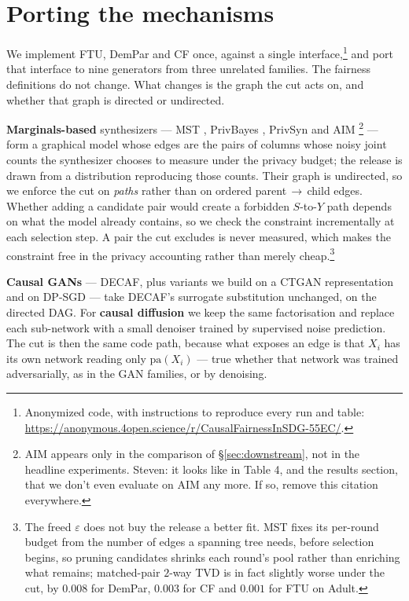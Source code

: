 \documentclass{article}
\newcommand{\s}[1]{\textcolor{Dandelion}{Steven: #1}}
\begin{document}
\section{Porting the mechanisms}
\label{sec:method}

We implement FTU, DemPar and CF once, against a single
interface,\footnote{Anonymized code, with instructions to reproduce every run
and table: \url{https://anonymous.4open.science/r/CausalFairnessInSDG-55EC/}.}
and port that interface to nine generators from three unrelated families. The
fairness definitions do not change. What changes is the graph the cut acts on,
and whether that graph is directed or undirected.

\textbf{Marginals-based} synthesizers --- MST \citep{mckenna2021mst},
PrivBayes \citep{zhang2014privbayes}, PrivSyn \citep{zhang2021privsyn} and
AIM \citep{mckenna2022aim}\footnote{AIM appears only in the comparison of
\S\ref{sec:downstream}, not in the headline experiments. \s{it looks like in Table 4, and the results section, that we don't even evaluate on AIM any more. If so, remove this citation everywhere.}} --- form a graphical model
whose edges are the pairs of columns whose noisy joint counts the synthesizer
chooses to measure under the privacy budget; the release is drawn from a
distribution reproducing those counts. Their graph is undirected, so we
enforce the cut on \emph{paths} rather than on ordered
parent\,$\rightarrow$\,child edges. Whether adding a candidate pair would
create a forbidden $S$-to-$Y$ path depends on what the model already
contains, so we check the constraint incrementally at each selection step. A
pair the cut excludes is never measured, which makes the constraint free in
the privacy accounting rather than merely cheap.\footnote{The freed
$\varepsilon$ does not buy the release a better fit. MST fixes its per-round
budget from the number of edges a spanning tree needs, before selection
begins, so pruning candidates shrinks each round's pool rather than enriching
what remains; matched-pair $2$-way TVD is in fact slightly worse under the
cut, by $0.008$ for DemPar, $0.003$ for CF and $0.001$ for FTU on Adult.}

\textbf{Causal GANs} --- DECAF, plus variants we build on a CTGAN
representation \citep{xu2019ctgan} and on DP-SGD \citep{abadi2016dpsgd} ---
take DECAF's surrogate substitution unchanged, on the directed DAG. For
\textbf{causal diffusion} we keep the same factorisation and replace each
sub-network with a small denoiser trained by supervised noise prediction. The
cut is then the same code path, because what exposes an edge is that $X_i$ has
its own network reading only $\mathrm{pa}(X_i)$ --- true whether that network
was trained adversarially, as in the GAN families, or by denoising.
\end{document}

